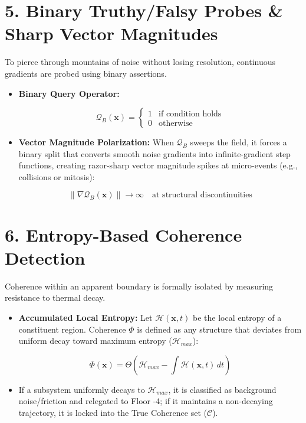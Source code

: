 \medskip

\section{\texorpdfstring{5. Binary Truthy/Falsy Probes \& Sharp Vector Magnitudes}{5. Binary Truthy/Falsy Probes \& Sharp Vector Magnitudes}}

To pierce through mountains of noise without losing resolution, continuous gradients are probed using binary assertions.

\begin{itemize}
\item \textbf{Binary Query Operator:}

\[
\mathcal{Q}_B(\mathbf{x}) = \begin{cases} 1 & \text{if condition holds} \\ 0 & \text{otherwise} \end{cases}
\]
\item \textbf{Vector Magnitude Polarization:} When \(\mathcal{Q}_B\) sweeps the field, it forces a binary split that converts smooth noise gradients into infinite-gradient step functions, creating razor-sharp vector magnitude spikes at micro-events (e.g., collisions or mitosis):

\[
\|\nabla \mathcal{Q}_B(\mathbf{x})\| \to \infty \quad \text{at structural discontinuities}
\]
\end{itemize}

\medskip

\section{\texorpdfstring{6. Entropy-Based Coherence Detection}{6. Entropy-Based Coherence Detection}}

Coherence within an apparent boundary is formally isolated by measuring resistance to thermal decay.

\begin{itemize}
\item \textbf{Accumulated Local Entropy:} Let \(\mathcal{H}(\mathbf{x}, t)\) be the local entropy of a constituent region. Coherence \(\Phi\) is defined as any structure that deviates from uniform decay toward maximum entropy (\(\mathcal{H}_{max}\)):

\[
\Phi(\mathbf{x}) = \Theta \left( \mathcal{H}_{max} - \int \mathcal{H}(\mathbf{x}, t) \, dt \right)
\]
\item If a subsystem uniformly decays to \(\mathcal{H}_{max}\), it is classified as background noise/friction and relegated to Floor -4; if it maintains a non-decaying trajectory, it is locked into the True Coherence set (\(\mathcal{C}\)).
\end{itemize}
